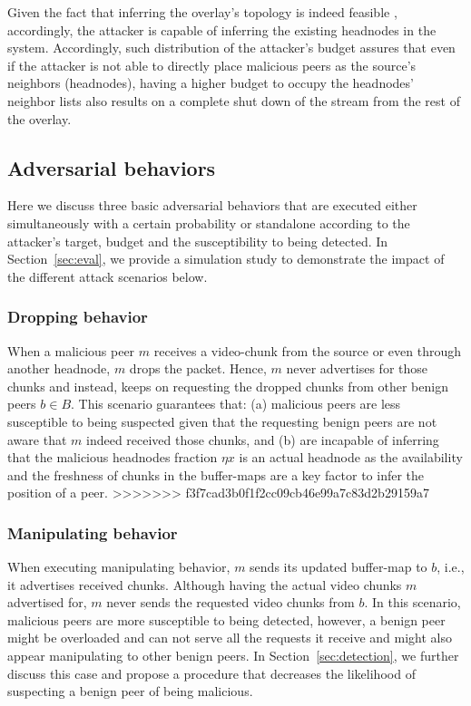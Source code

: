Given the fact that inferring the overlay's topology is indeed feasible \cite{nguyen2016swap,rbcs}, accordingly, the attacker is capable of inferring the existing headnodes in the system.
Accordingly, such distribution of the attacker's budget assures that even if the attacker is not able to directly place malicious peers as the source's neighbors (headnodes), having a higher budget to occupy the headnodes' neighbor lists also results on a complete shut down of the stream from the rest of the overlay.

\subsection{Adversarial behaviors}
Here we discuss three basic adversarial behaviors that are executed either simultaneously with a certain probability or standalone according to the attacker's target, budget and the susceptibility to being detected.
In Section~\ref{sec:eval}, we provide a simulation study to demonstrate the impact of the different attack scenarios below.

\subsubsection*{Dropping behavior}
When a malicious peer $m$ receives a video-chunk from the source or even through another headnode, $m$ drops the packet. 
Hence, $m$ never advertises for those chunks and instead, keeps on requesting the dropped chunks from other benign peers $b \in B$.
This scenario guarantees that: (a) malicious peers are less susceptible to being suspected given that the requesting benign peers are not aware that $m$ indeed received those chunks,
and (b) are incapable of inferring that the malicious headnodes fraction $\eta x$ is an actual headnode as the availability and the freshness of chunks in the buffer-maps are a key factor to infer the position of a peer.
>>>>>>> f3f7cad3b0f1f2cc09cb46e99a7c83d2b29159a7

\subsubsection*{Manipulating behavior}
When executing manipulating behavior, $m$ sends its updated buffer-map to $b$, i.e., it advertises received chunks. 
Although having the actual video chunks $m$ advertised for, $m$ never sends the requested video chunks from $b$.
In this scenario, malicious peers are more susceptible to being detected, however, a benign peer might be overloaded and can not serve all the requests it receive and might also appear manipulating to other benign peers.
In Section~\ref{sec:detection}, we further discuss this case and propose a procedure that decreases the likelihood of suspecting a benign peer of being malicious.

